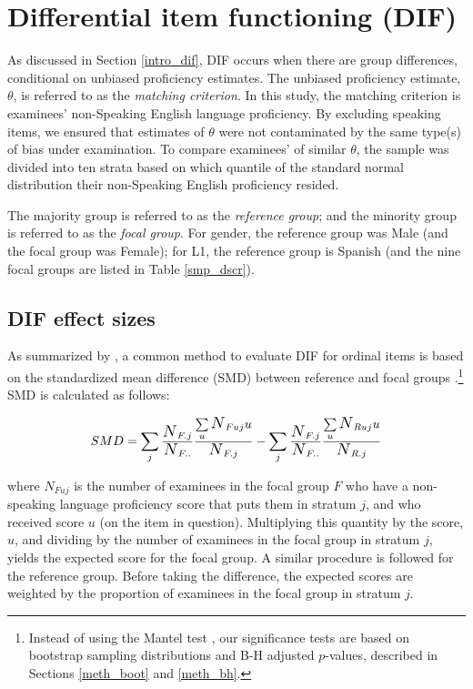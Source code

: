 \documentclass [PhD] {uclathes}
\newcommand{\sbN}{\scalebox{1.25}{$N$}}
\begin{document}
\section{Differential item functioning (DIF)}
\label{meth_dif}

As discussed in Section \ref{intro_dif}, DIF occurs when there are group differences, conditional on unbiased proficiency estimates. The unbiased proficiency estimate, $\theta$, is referred to as the \emph{matching criterion}. In this study, the matching criterion is examinees' non-Speaking English language proficiency. By excluding speaking items, we ensured that estimates of $\theta$ were not contaminated by the same type(s) of bias under examination. To compare examinees' of similar $\theta$, the sample was divided into ten strata based on which quantile of the standard normal distribution their non-Speaking English proficiency resided.

The majority group is referred to as the \emph{reference group}; and the minority group is referred to as the \emph{focal group}. For gender, the reference group was Male (and the focal group was Female); for L1, the reference group is Spanish (and the nine focal groups are listed in Table \ref{smp_dscr}).

\subsection{DIF effect sizes}
\label{meth_fx}

As summarized by \cite{michaelides2008}, a common method to evaluate DIF for ordinal items is based on the standardized mean difference (SMD) between reference and focal groups \citep{dorans1986}.\footnote{Instead of using the Mantel test \citep{mantel1963}, our significance tests are based on bootstrap sampling distributions and B-H adjusted $p$-values, described in Sections \ref{meth_boot} and \ref{meth_bh}.} SMD is calculated as follows:

$$
SMD = \sum_j{\frac{\sbN_{F.j}}{\sbN_{F..}}}\frac{\sum\limits_u{\sbN_{Fuj}u}}{\sbN_{F.j}} - \sum_j{\frac{\sbN_{F.j}}{\sbN_{F..}}}\frac{\sum\limits_u{\sbN_{Ruj}u}}{\sbN_{R.j}}
$$

where $N_{Fuj}$ is the number of examinees in the focal group $F$ who have a non-speaking language proficiency score that puts them in stratum $j$, and who received score $u$ (on the item in question). Multiplying this quantity by the score, $u$, and dividing by the number of examinees in the focal group in stratum $j$, yields the expected score for the focal group. A similar procedure is followed for the reference group. Before taking the difference, the expected scores are weighted by the proportion of examinees in the focal group in stratum $j$. 
\end{document}
